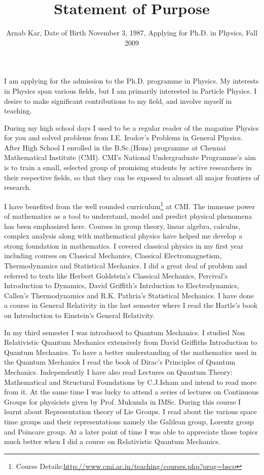 \documentclass[12pt,a4paper,oneside]{amsart}
\title{Statement of Purpose}
\author{\small{Arnab Kar, Date of Birth November 3, 1987, Applying for Ph.D. in Physics, Fall 2009}}
\begin{document}
\maketitle
\fancyhead{}
\fancyfoot{}

\cfoot{\thepage}

I am applying for the admission to the Ph.D. programme in Physics. My interests in Physics span various fields, but I am primarily interested in Particle Physics. I desire to make significant contributions to my field, and involve myself in teaching.

During my high school days I used to be a regular reader of the magazine Physics for you and solved problems from I.E. Irodov's Problems in General Physics. After High School I enrolled in the B.Sc.(Hons) programme at Chennai Mathematical Institute (CMI). CMI's National Undergraduate Programme's aim is to train a small, selected group of promising students by active researchers in their respective fields, so that they can be exposed to almost all major frontiers of research. 

I have benefited from the well rounded curriculum\footnote{Course Details:\url{http://www.cmi.ac.in/teaching/courses.php?prog=bscp}} at CMI. The immense power of mathematics as a tool to understand, model and predict physical phenomena has been emphasized here. Courses in group theory, linear algebra, calculus, complex analysis along with mathematical physics have helped me develop a strong foundation in mathematics. I covered classical physics in my first year including courses on Classical Mechanics, Classical Electromagnetism, Thermodynamics and Statistical Mechanics. I did a great deal of problem and referred to texts like Herbert Goldstein's Classical Mechanics, Percival's Introduction to Dynamics, David Griffith's Intrduction to Electrodynamics, Callen's Thermodynamics and R.K. Pathria's Statistical Mechanics. I have done a course in General Relativity in the last semester where I read the Hartle's book on Introduction to Einstein's General Relativity. 

In my third semester I was introduced to Quantum Mechanics. I studied Non Relativistic Quantum Mechanics extensively from David Griffiths Introduction to Quantum Mechanics. To have a better understanding of the mathematics used in the Quantum Mechanics I read the book of Dirac's Principles of Quantum Mechanics. Independently I have also read Lectures on Quantum Theory: Mathematical and Structural Foundations by C.J.Isham and intend to read more from it. At the same time I was lucky to attend a series of lectures on Continuous Groups for physicists given by Prof. Mukunda in IMSc. During this course I learnt about Representation theory of Lie Groups. I read about the various space time groups and their representations namely the Galilean group, Lorentz group and Poincare group. At a later point of time I was able to appreciate those topics much better when I did a course on Relativistic Quantum Mechanics.
\end{document}
